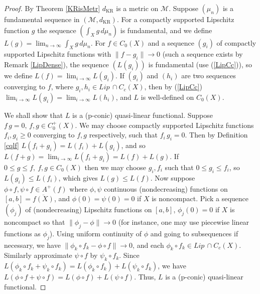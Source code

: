 \documentclass[sn-mathphys-num]{sn-jnl}%
\theoremstyle{thmstyleone}%
\theoremstyle{definition}
\begin{document}
\begin{proof}
By Theorem \ref{KRisMetr} $d_{\text{KR}}$ is a metric on $\mathcal{M}$.   
Suppose $(\mu_n)$ is a fundamental sequence in $(\mathcal{M}, d_{\text{KR}}). $ 
For a compactly supported Lipschitz function $g$  the sequence $( \int_X g\, d \mu_n)$ is fundamental, 
and we define $L(g) = \lim_{n \rightarrow \infty} \int_X g\, d \mu_n$.
For $f \in C_0(X)$ and a sequence $(g_i)$ of compactly supported Lipschitz functions with 
$\| f - g_i \| \rightarrow 0$ (such a sequence exists by Remark \ref{LipDense}), 
the sequence $ (L(g_i))$ is fundamental (use (\ref{LipCc})), so we define $L(f) = \lim_{i \rightarrow \infty} L(g_i)$.
If $(g_i)$ and $(h_i)$ are two sequences converging to $f$, where $ g_i, h_i \in Lip  \, \cap C_c(X)$, then 
by (\ref{LipCc})   $\lim_{i \rightarrow \infty} L(g_i) = \lim_{i \rightarrow \infty} L(h_i)$, and $L$ is well-defined on $C_0(X)$.

We shall show that $L$ is a (p-conic) quasi-linear functional. Suppose $f \, g = 0, \, f,g \in C_0^+(X)$. We may choose 
compactly supported Lipschitz functions $f_i,  g_i  \ge 0$ converging to $f, g$ respectively, such that  $f_i \, g_i = 0$.
Then by Definition \ref{cqlf} $L(f_i + g_i) =L(f_i) + L(g_i)$, and so $L(f+g) =  \lim_{i \rightarrow \infty} L(f_i + g_i)  = L(f) + L(g)$. 
If $0 \le g \le f, \ f,g \in C_0(X)$ then we may choose $g_i, f_i$ such that $ 0 \le g_i \le f_i$, so $L(g_i) \le L(f_i)$, which gives $L(g) \le L(f)$.
Now suppose $ \phi \circ f, \psi \circ f \in A^+(f)$ where $ \phi, \psi$ continuous (nondecreasing) functions on $[a,b] = \overline{f(X)}$, 
and  $ \phi(0) = \psi(0) = 0$ if $X$ is noncompact. Pick a sequence $(\phi_j)$ of (nondecreasing) Lipschitz functions on $[a,b]$, 
$\phi_j(0) =0$ if $X$ is noncompact so that $\| \phi_j - \phi \| \rightarrow 0$ (for instance, one may use piecewise linear functions as $\phi_j$).    
Using uniform continuity of $ \phi$ and going to subsequences if necessary, we have $ \| \phi_k \circ f_k - \phi \circ f \| \rightarrow 0$, 
and each $\phi_k \circ f_k \in Lip \, \cap C_c(X)$. 
Similarly approximate $ \psi \circ f$ by $ \psi_k \circ f_k$. 
Since $L(  \phi_k \circ f_k  +  \psi_k \circ f_k) = L( \phi_k \circ f_k) + L( \psi_k \circ f_k)$, 
we have $L(\phi \circ f + \psi \circ f) = L(\phi \circ f) + L( \psi \circ f)$.
Thus, $L$ is a (p-conic) quasi-linear functional. 


\end{proof}
\end{document}
